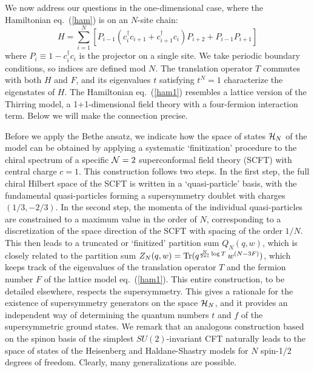 \documentclass[a4paper,prl,aps,twocolumn]{revtex4}
\begin{document}
We now address our questions in the one-dimensional case,
where the Hamiltonian eq.~(\ref{ham}) is on an $N$-site chain: 
\begin{equation}  
H= \sum_{i=1}^N \left[P_{i-1}  
\left( c^\dagger_i c_{i+1} + c^\dagger_{i+1}c_i\right)P_{i+2}  
 +P_{i-1}P_{i+1}\right]  
\label{ham1}  
\end{equation}  
where $P_i\equiv 1-c^\dagger_i c_i$ is the projector on a single site.  
We take periodic boundary conditions, so indices are defined 
mod $N$. The translation operator $T$ commutes with
both $H$ and $F$, and its
eigenvalues $t$ satisfying $t^N=1$ 
characterize the eigenstates of $H$. The Hamiltonian eq.~(\ref{ham1})
resembles a lattice version of the Thirring model,  
a 1$+$1-dimensional field theory with a four-fermion interaction term.   
Below we will make the connection precise.
  
Before we apply the Bethe ansatz,  
we indicate how the space of states ${\cal H}_N$ of the model can be  
obtained by applying a systematic `finitization' procedure  
\cite{kjs-bs} to the chiral spectrum of a specific ${\cal N}=2$   
superconformal field theory (SCFT) with central charge $c=1$.   
This construction follows two steps. In the first step,  
the full chiral Hilbert space of the SCFT is written in a   
`quasi-particle' basis, with the fundamental quasi-particles 
forming a supersymmetry doublet with charges $(1/3,-2/3)$. 
In the second step, the momenta of the individual quasi-particles 
are constrained to  
a maximum value in the order of $N$, corresponding to a discretization  
of the space direction of the SCFT with spacing of the order $1/N$.   
This then leads to a truncated or `finitized' partition sum $Q_N(q,w)$,  
which is closely related to the partition sum   
$Z_N(q,w) = {\rm Tr}(q^{\frac{N}{2\pi i} \log T} \, w^{(N-3F)})$,   
which keeps track of the eigenvalues of the translation operator $T$   
and the fermion number $F$ of the lattice model eq.~(\ref{ham1}).  
This entire construction, to be detailed elsewhere, respects  
the supersymmetry. This gives a rationale for the existence   
of supersymmetry generators on the space ${\cal H}_N$, and it  
provides an independent way of determining the quantum numbers   
$t$ and $f$ of the supersymmetric ground states. We   
remark that an analogous construction based on the spinon basis of   
the simplest $SU(2)$-invariant CFT naturally leads to the space of   
states of the Heisenberg and Haldane-Shastry models for $N$ spin-1/2   
degrees of freedom. Clearly, many generalizations are possible.  
  
\end{document}
